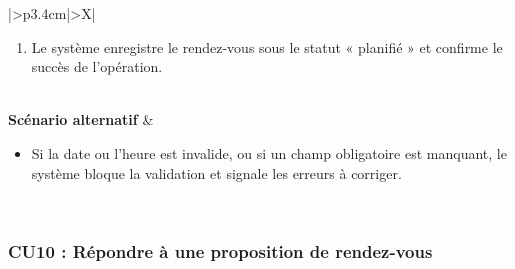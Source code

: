 ﻿\documentclass[a4paper,12pt]{report}
\begin{document}
\begin{table}[H]
\begin{tabularx}{\textwidth}{|>{\RaggedRight\arraybackslash}p{3.4cm}|>{\RaggedRight\arraybackslash}X|}
\begin{minipage}[t]{\linewidth}
\begin{enumerate}[label=\arabic*., leftmargin=*, topsep=0pt, itemsep=1pt]
    \item Le système enregistre le rendez-vous sous le statut « planifié » et confirme le succès de l'opération.
\end{enumerate}
\vspace{2pt}
\end{minipage} \\
\hline
\textbf{Scénario alternatif} &
\begin{minipage}[t]{\linewidth}\sloppy
\vspace{2pt}
\begin{itemize}[leftmargin=*, topsep=0pt, itemsep=1pt]
    \item  Si la date ou l'heure est invalide, ou si un champ obligatoire est manquant, le système bloque la validation et signale les erreurs à corriger.
\end{itemize}
\vspace{2pt}
\end{minipage} \\
\hline
\end{tabularx}
\fussy
\end{table}
\endgroup

\begingroup
\setlength{\emergencystretch}{3em}
\subsubsection*{CU10 : Répondre à une proposition de rendez-vous}
\end{document}
